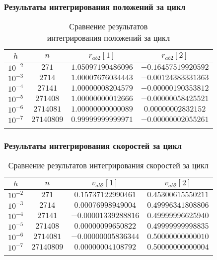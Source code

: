 \begin{frame}
\frametitle{Результаты интегрирования положений за цикл}

\begin{table}[h]
  \centering
  \caption{Сравнение результатов \\ интегрирования положений за цикл}
  \begin{tabular}{cccc}
    \toprule
    $ h $ &
    $ n $ &
    $ r_{ab2}[1] $ &
    $ r_{ab2}[2] $ \\
    \midrule
    $ 10^{-2} $ & $ 271 $ & $ 1.05097190486096 $ & $ -0.16457519920592 $ \\
    \arrayrulecolor{black!40}
    \midrule
    $ 10^{-3} $ & $ 2714 $ & $ 1.00007676034443 $ & $ -0.00124383331363 $ \\
    \midrule
    $ 10^{-4} $ & $ 27141 $ & $ 1.00000008204579 $ & $ -0.00000190353812 $ \\
    \midrule
    $ 10^{-5} $ & $ 271408 $ & $ 1.00000000012666 $ & $ -0.00000058425521 $ \\
    \midrule
    $ 10^{-6} $ & $ 2714081 $ & $ 1.00000000000089 $ & $ 0.00000002832152 $ \\
    \midrule
    $ 10^{-7} $ & $ 27140809 $ & $ 0.99999999999971 $ & $ -0.00000002055261 $ \\
    \arrayrulecolor{black}
    \bottomrule
  \end{tabular}
\end{table}

\end{frame}

\begin{frame}
\frametitle{Результаты интегрирования скоростей за цикл}

\begin{table}[h]
  \centering
  \caption{Сравнение результатов интегрирования скоростей за цикл}
  \begin{tabular}{cccc}
    \toprule
    $ h $ &
    $ n $ &
    $ v_{ab2}[1] $ &
    $ v_{ab2}[2] $ \\
    \midrule
    $ 10^{-2} $ & $ 271 $ & $ 0.15737122990461 $ & $ 0.45300615550211 $ \\
    \arrayrulecolor{black!40}
    \midrule
    $ 10^{-3} $ & $ 2714 $ & $ 0.00076998949004 $ & $ 0.49996341808806 $ \\
    \midrule
    $ 10^{-4} $ & $ 27141 $ & $ -0.00001339288816 $ & $ 0.49999996625940 $ \\
    \midrule
    $ 10^{-5} $ & $ 271408 $ & $ 0.00000099650822 $ & $ 0.49999999998835 $ \\
    \midrule
    $ 10^{-6} $ & $ 2714081 $ & $ -0.00000005836344 $ & $ 0.50000000000010 $ \\
    \midrule
    $ 10^{-7} $ & $ 27140809 $ & $ 0.00000004108792 $ & $ 0.50000000000004 $ \\
    \arrayrulecolor{black}
    \bottomrule
  \end{tabular}
\end{table}

\end{frame}

